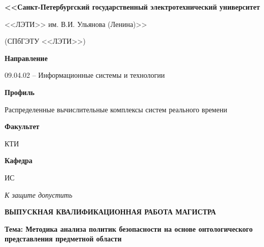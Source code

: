 \documentclass[../main]{subfiles}
\begin{document}
\begin{titlepage}
    \centering
    
    {\bfseries\small
        <<Санкт-Петербургский государственный электротехнический университет

        <<ЛЭТИ>> им. В.И. Ульянова (Ленина)>>
        
        (СПбГЭТУ <<ЛЭТИ>>)
    }

    \vspace{1cm}
    
    \textbf{Направление}\hfill\begin{minipage}[t]{12cm}
        09.04.02 -- Информационные системы и технологии
    \end{minipage}

    \textbf{Профиль}\hfill\begin{minipage}[t]{12cm}
        Распределенные вычислительные комплексы систем реального времени
    \end{minipage}\newline
    
    \textbf{Факультет}\hfill\begin{minipage}[t]{12cm}
        КТИ
    \end{minipage}
    
    \textbf{Кафедра}\hfill\begin{minipage}[t]{12cm}
        ИС
    \end{minipage}
    
    \vspace{1cm}

    \textit{К защите допустить}\hspace{\fill}
    
    \hfill
    \hfill
     
    
    \vspace{1cm}
    
    \MakeUppercase{\bfseries\large
        выпускная квалификационная работа магистра
    }

    {\bfseries
        Тема: Методика анализа политик безопасности на основе онтологического представления предметной области
    }

    \vfill

    \hfill 
     


\end{titlepage}
\end{document}
